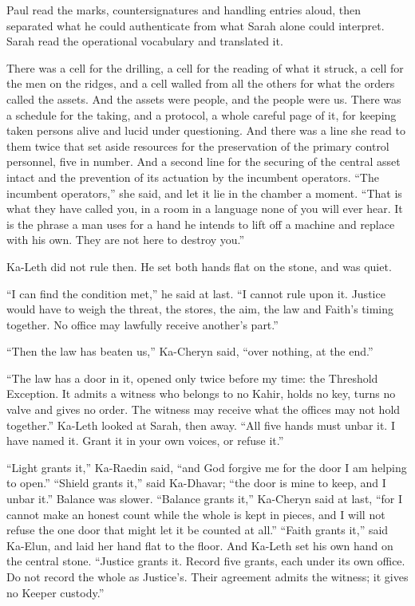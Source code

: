 Paul read the marks, countersignatures and handling entries aloud, then separated what he could authenticate from what Sarah alone could interpret. Sarah read the operational vocabulary and translated it.\par

There was a cell for the drilling, a cell for the reading of what it struck, a cell for the men on the ridges, and a cell walled from all the others for what the orders called the assets. And the assets were people, and the people were us. There was a schedule for the taking, and a protocol, a whole careful page of it, for keeping taken persons alive and lucid under questioning. And there was a line she read to them twice that set aside resources for the preservation of the primary control personnel, five in number. And a second line for the securing of the central asset intact and the prevention of its actuation by the incumbent operators. ``The incumbent operators,'' she said, and let it lie in the chamber a moment. ``That is what they have called you, in a room in a language none of you will ever hear. It is the phrase a man uses for a hand he intends to lift off a machine and replace with his own. They are not here to destroy you.''\par

\ornament

Ka-Leth did not rule then. He set both hands flat on the stone, and was quiet.\par

``I can find the condition met,'' he said at last. ``I cannot rule upon it. Justice would have to weigh the threat, the stores, the aim, the law and Faith's timing together. No office may lawfully receive another's part.''\par

``Then the law has beaten us,'' Ka-Cheryn said, ``over nothing, at the end.''\par

``The law has a door in it, opened only twice before my time: the Threshold Exception. It admits a witness who belongs to no Kahir, holds no key, turns no valve and gives no order. The witness may receive what the offices may not hold together.'' Ka-Leth looked at Sarah, then away. ``All five hands must unbar it. I have named it. Grant it in your own voices, or refuse it.''

``Light grants it,'' Ka-Raedin said, ``and God forgive me for the door I am helping to open.'' ``Shield grants it,'' said Ka-Dhavar; ``the door is mine to keep, and I unbar it.'' Balance was slower. ``Balance grants it,'' Ka-Cheryn said at last, ``for I cannot make an honest count while the whole is kept in pieces, and I will not refuse the one door that might let it be counted at all.'' ``Faith grants it,'' said Ka-Elun, and laid her hand flat to the floor. And Ka-Leth set his own hand on the central stone. ``Justice grants it. Record five grants, each under its own office. Do not record the whole as Justice's. Their agreement admits the witness; it gives no Keeper custody.''\par

